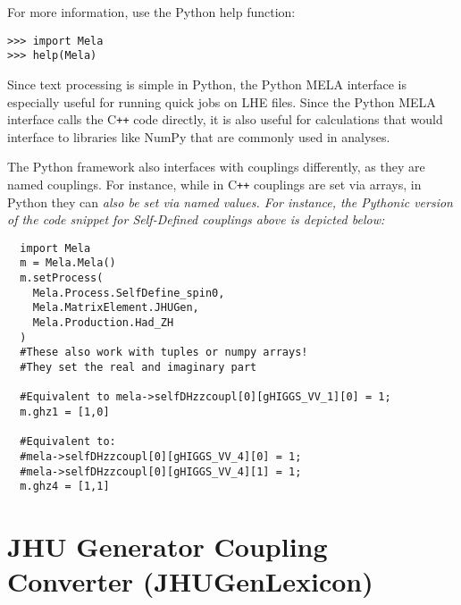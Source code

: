 \documentclass[aps,superscriptaddress,nofootinbib]{revtex4}
\begin{document}
For more information, use the Python help function:
\begin{verbatim}
>>> import Mela
>>> help(Mela)
\end{verbatim}
Since text processing is simple in Python, the Python MELA interface is especially useful for running quick jobs on LHE files. Since the Python MELA interface calls the C\texttt{++} code directly, it is also useful for calculations that would interface to libraries like NumPy that are commonly used in analyses.

The Python framework also interfaces with couplings differently, as they are named couplings. For instance, while in C\texttt{++} couplings are set via arrays, in Python they can \em{also} be set via named values. For instance, the Pythonic version of the code snippet for Self-Defined couplings above is depicted below:
\begin{verbatim}
  import Mela
  m = Mela.Mela()
  m.setProcess(
    Mela.Process.SelfDefine_spin0, 
    Mela.MatrixElement.JHUGen, 
    Mela.Production.Had_ZH
  )
  #These also work with tuples or numpy arrays!
  #They set the real and imaginary part
  
  #Equivalent to mela->selfDHzzcoupl[0][gHIGGS_VV_1][0] = 1;
  m.ghz1 = [1,0] 

  #Equivalent to:
  #mela->selfDHzzcoupl[0][gHIGGS_VV_4][0] = 1;
  #mela->selfDHzzcoupl[0][gHIGGS_VV_4][1] = 1;
  m.ghz4 = [1,1]
\end{verbatim}


\section{JHU Generator Coupling Converter (JHUGenLexicon)}
\end{document}
